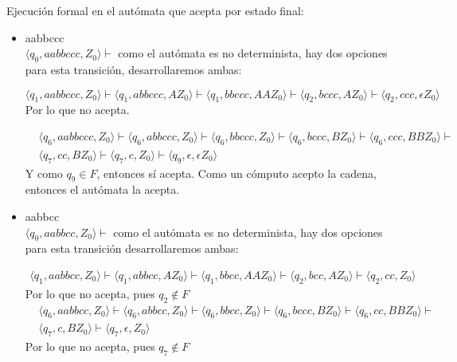 \documentclass{article}
\begin{document}
\begin{enumerate}
{\begin{enumerate}
{        	Ejecución formal en el autómata que acepta por estado final:
        	\begin{itemize}
        		\item {
        		aabbccc\\
				$\langle q_0, aabbccc, Z_0 \rangle \vdash$ como el autómata es
				no determinista, hay dos opciones para esta transición,
				desarrollaremos ambas:

        		\[
					\langle q_1, aabbccc, Z_0 \rangle \vdash
					\langle q_1, abbccc, AZ_0 \rangle \vdash
					\langle q_1, bbccc, AAZ_0 \rangle \vdash
					\langle q_2, bccc, AZ_0 \rangle \vdash
					\langle q_2, ccc, \epsilon Z_0 \rangle
				\]
				Por lo que no acepta.

        		\begin{align*}
					&\langle q_6, aabbccc, Z_0 \rangle \vdash
					\langle q_6, abbccc, Z_0 \rangle \vdash
					\langle q_6, bbccc, Z_0 \rangle \vdash
					\langle q_6, bccc, BZ_0 \rangle \vdash
					\langle q_6, ccc, BBZ_0 \rangle \vdash \\
					&\langle q_7, cc, BZ_0 \rangle \vdash
					\langle q_7, c, Z_0 \rangle \vdash
					\langle q_9, \epsilon, \epsilon Z_0 \rangle
				\end{align*}
				Y como $q_9 \in F$, entonces sí acepta.
        		Como un cómputo acepto la cadena, entonces el autómata la acepta.
        		}
        		\item {
        		aabbcc \\
				$\langle q_0, aabbcc, Z_0 \rangle \vdash$ como el autómata es no
				determinista, hay dos opciones para esta transición
				desarrollaremos ambas:

				\begin{align*}
					\langle q_1, aabbcc, Z_0 \rangle \vdash
					\langle q_1, abbcc, AZ_0 \rangle \vdash
					\langle q_1, bbcc, AAZ_0 \rangle \vdash
					\langle q_2, bcc, AZ_0 \rangle \vdash
					\langle q_2, cc, Z_0 \rangle
				\end{align*}
				Por lo que no acepta, pues $q_2 \not \in F$
        		\begin{align*}
					&\langle q_6, aabbcc, Z_0 \rangle \vdash
					\langle q_6, abbcc, Z_0 \rangle \vdash
					\langle q_6, bbcc, Z_0 \rangle \vdash
					\langle q_6, bccc, BZ_0 \rangle \vdash
					\langle q_6, cc, BBZ_0 \rangle \vdash \\
					&\langle q_7, c, BZ_0 \rangle \vdash
					\langle q_7, \epsilon, Z_0 \rangle
				\end{align*}
				Por lo que no acepta, pues $q_7 \not \in F$

}
\end{itemize}}
\end{enumerate}}
\end{enumerate}
\end{document}
